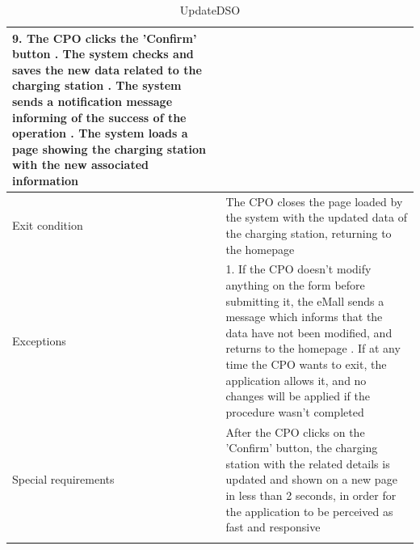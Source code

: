\begin{center}
\begin{longtable}{p{4cm} p{11cm}}
                    9. The CPO clicks the 'Confirm' button \newline
                    10. The system checks and saves the new data related to the charging station \newline
                    11. The system sends a notification message informing of the success of the operation \newline
                    12. The system loads a page showing the charging station with the new associated information\\
     \hline
     Exit condition &  The CPO closes the page loaded by the system with the updated data of the charging station, returning to the homepage \\
     \hline
     Exceptions &   1. If the CPO doesn't modify anything on the form before submitting it, the eMall sends a                       message which informs that the data have not been modified, and returns to the homepage \newline
                    2. If at any time the CPO wants to exit, the application allows it, and no changes will be applied if the procedure wasn't completed \\
     \hline
     Special requirements & After the CPO clicks on the 'Confirm' button, the charging station with the related details is updated and shown on a new page in less than 2 seconds, in order for the application to be perceived as fast and responsive \\
     \hline
    \caption{UpdateDSO}
    \label{tab:UpdateDSO}
    \end{longtable}
\end{center}

